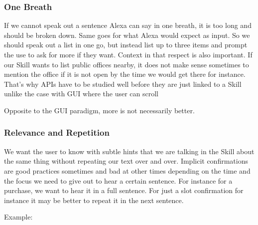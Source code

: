 \subsubsection*{One Breath}
If we cannot speak out a sentence Alexa can say in one breath, it is too long and should be broken down. Same goes for what Alexa would expect as input. %
So we should speak out a list in one go, but instead list up to three items and prompt the use to ask for more if they want. Context in that respect is also important. If our Skill wants to list public offices nearby, it does not make sense sometimes to mention the office if it is not open by the time we would get there for instance. That's why APIs have to be studied well before they are just linked to a Skill unlike the case with GUI where the user can scroll

Opposite to the GUI paradigm, more is not necessarily better.

\subsubsection*{Relevance and Repetition}

We want the user to know with subtle hints that we are talking in the Skill about the same thing without repeating our text over and over. Implicit confirmations are good practices sometimes and bad at other times depending on the time and the focus we need to give out to hear a certain sentence. For instance for a purchase, we want to hear it in a full sentence. For just a slot confirmation for instance it may be better to repeat it in the next sentence.

\noindent Example:




\begin{flushright}
\end{flushright}

